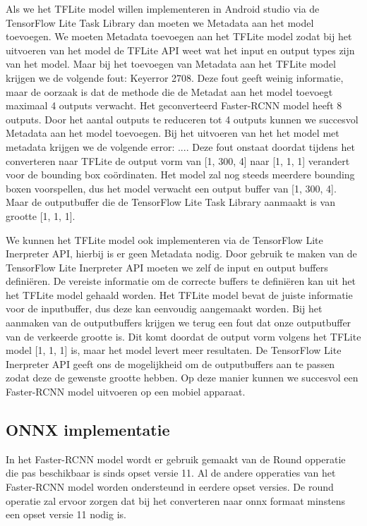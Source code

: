 Als we het TFLite model willen implementeren in Android studio via de TensorFlow Lite Task Library dan moeten we Metadata aan het model toevoegen.
We moeten Metadata toevoegen aan het TFLite model zodat bij het uitvoeren van het model de TFLite API weet wat het input en output types zijn van het model.
Maar bij het toevoegen van Metadata aan het TFLite model krijgen we de volgende fout: Keyerror 2708.
Deze fout geeft weinig informatie, maar de oorzaak is dat de methode die de Metadat aan het model toevoegt maximaal 4 outputs verwacht.
Het geconverteerd Faster-RCNN model heeft 8 outputs.
Door het aantal outputs te reduceren tot 4 outputs kunnen we succesvol Metadata aan het model toevoegen.
Bij het uitvoeren van het het model met metadata krijgen we de volgende error: ....
Deze fout onstaat doordat tijdens het converteren naar TFLite de output vorm van [1, 300, 4] naar [1, 1, 1] verandert voor de bounding box co\"ordinaten.
Het model zal nog steeds meerdere bounding boxen voorspellen, dus het model verwacht een output buffer van [1, 300, 4].
Maar de outputbuffer die de TensorFlow Lite Task Library aanmaakt is van grootte [1, 1, 1].

We kunnen het TFLite model ook implementeren via de TensorFlow Lite Inerpreter API, hierbij is er geen Metadata nodig.
Door gebruik te maken van de TensorFlow Lite Inerpreter API moeten we zelf de input en output buffers defini\"eren.
De vereiste informatie om de correcte buffers te defini\"eren kan uit het het TFLite model gehaald worden.
Het TFLite model bevat de juiste informatie voor de inputbuffer, dus deze kan eenvoudig aangemaakt worden.
Bij het aanmaken van de outputbuffers krijgen we terug een fout dat onze outputbuffer van de verkeerde grootte is.
Dit komt doordat de output vorm volgens het TFLite model [1, 1, 1] is, maar het model levert meer resultaten.
De TensorFlow Lite Inerpreter API geeft ons de mogelijkheid om de outputbuffers aan te passen zodat deze de gewenste grootte hebben.
Op deze manier kunnen we succesvol een Faster-RCNN model uitvoeren op een mobiel apparaat.


\subsection{ONNX implementatie}
In het Faster-RCNN model wordt er gebruik gemaakt van de Round opperatie die pas beschikbaar is sinds opset versie 11.
Al de andere opperaties van het Faster-RCNN model worden ondersteund in eerdere opset versies.
De round operatie zal ervoor zorgen dat bij het converteren naar onnx formaat minstens een opset versie 11 nodig is.


